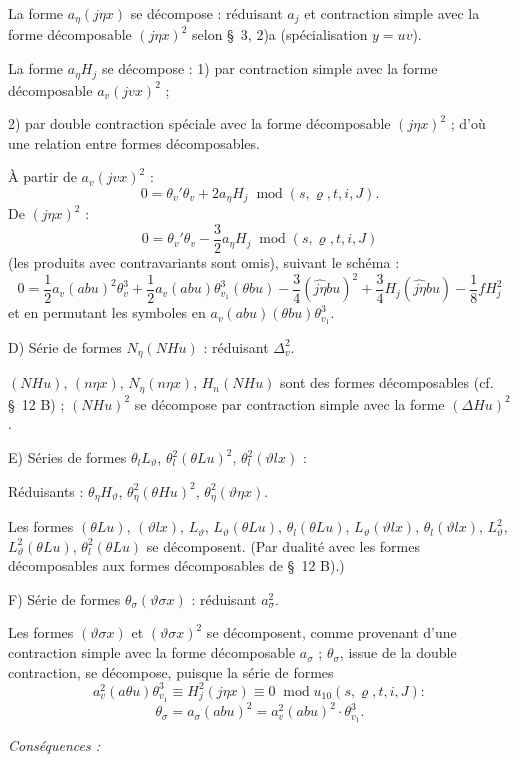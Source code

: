 \documentclass[11pt]{article}
\newcommand{\A}{\Delta}
\newcommand{\R}{\varrho}
\newcommand{\modu}[1]{\;\operatorname{mod} #1}
\providecommand{\modu}[1]{\;\operatorname{mod} #1}
\begin{document}
La forme $a_\eta(j\eta x)$ se décompose : réduisant $a_j$ et contraction simple avec la forme décomposable $(j\eta x)^2$ selon \S\ 3, 2)a (spécialisation $y=uv$).

La forme $a_\eta H_j$ se décompose : 1) par contraction simple avec la forme décomposable $a_v(jv x)^2$ ;

2) par double contraction spéciale avec la forme décomposable $(j\eta x)^2$ ; d'où une relation entre formes décomposables.

À partir de $a_v(jv x)^2$ :
\[
0=\theta_v'\theta_v+2a_\eta H_j\modu{(s,\R,t,i,J)}.
\]
De $(j\eta x)^2$ :
\[
0=\theta_v'\theta_v-\frac32a_\eta H_j\modu{(s,\R,t,i,J)}
\]
(les produits avec contravariants sont omis), suivant le schéma :
\[
0=\frac12a_v(abu)^2\theta_v^3
+\frac12a_v(abu)\theta_{v_1}^3(\theta bu)
-\frac34(\widehat{j\eta}bu)^2+\frac34H_j(\widehat{j\eta}bu)
-\frac18fH_j^2
\]
et en permutant les symboles en $a_v(abu)(\theta bu)\theta_{v_1}^3$.

\noindent D) Série de formes $N_\eta(NHu)$ : réduisant $\A_v^2$.

$(NHu)$, $(n\eta x)$, $N_\eta(n\eta x)$, $H_n(NHu)$ sont des formes décomposables (cf. \S\ 12 B) ; $(NHu)^2$ se décompose par contraction simple avec la forme $(\A Hu)^2$.

\noindent E) Séries de formes $\theta_lL_\vartheta$, $\theta_l^2(\theta Lu)^2$, $\theta_l^2(\vartheta lx)$ :

Réduisants : $\theta_\eta H_\vartheta$, $\theta_\eta^2(\theta Hu)^2$, $\theta_\eta^2(\vartheta\eta x)$.

Les formes $(\theta Lu)$, $(\vartheta lx)$, $L_\vartheta$, $L_\vartheta(\theta Lu)$, $\theta_l(\theta Lu)$, $L_\vartheta(\vartheta lx)$, $\theta_l(\vartheta lx)$, $L_\vartheta^2$, $L_\vartheta^2(\theta Lu)$, $\theta_l^2(\theta Lu)$ se décomposent. (Par dualité avec les formes décomposables aux formes décomposables de \S\ 12 B).)

\noindent F) Série de formes $\theta_\sigma(\vartheta\sigma x)$ : réduisant $a_\sigma^2$.

Les formes $(\vartheta\sigma x)$ et $(\vartheta\sigma x)^2$ se décomposent, comme provenant d'une contraction simple avec la forme décomposable $a_\sigma$ ; $\theta_\sigma$, issue de la double contraction, se décompose, puisque la série de formes
\[
a_v^2(a\theta u)\theta_{v_1}^3\equiv H_j^2(j\eta x)\equiv0\modu{u_{10}(s,\R,t,i,J)}:
\]
\[
\theta_\sigma=a_\sigma(abu)^2=a_v^2(abu)^2\cdot\theta_{v_1}^3.
\]

\noindent\emph{Conséquences :}
\end{document}

